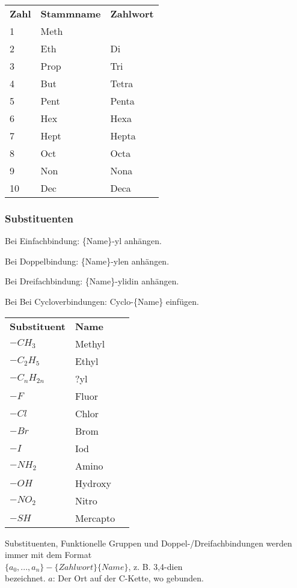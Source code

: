 \begin{center}
	\begin{tabular}{ l  l  l }
		\textbf{Zahl} & \textbf{Stammname} & \textbf{Zahlwort} \\
		1 & Meth & \\
		2 & Eth & Di\\
		3 & Prop & Tri\\
		4 & But & Tetra\\
		5 & Pent & Penta\\
		6 & Hex & Hexa\\
		7 & Hept & Hepta\\
		8 & Oct & Octa\\
		9 & Non &Nona\\
		10 & Dec &Deca\\
	\end{tabular}
\end{center}

\subsubsection{Substituenten}

Bei Einfachbindung: \{Name\}-yl anhängen.

Bei Doppelbindung:  \{Name\}-ylen anhängen.

Bei Dreifachbindung:  \{Name\}-ylidin anhängen.

Bei Bei Cycloverbindungen:  Cyclo-\{Name\} einfügen.

\begin{center}
	\begin{tabular}{ l  l  l }
		\textbf{Substituent} & \textbf{Name} \\
		$-CH_3$ & Methyl \\
		$-C_2H_5$ & Ethyl \\
		$-C_nH_{2n}$ & ?yl \\
		$-F$ & Fluor \\
		$-Cl$ & Chlor \\
		$-Br$ & Brom \\
		$-I$ & Iod \\
		$-NH_2$ & Amino \\
		$-OH$ & Hydroxy \\
		$-NO_2$ & Nitro \\
		$-SH$ & Mercapto \\
	\end{tabular}
\end{center}

\begin{note}
	Substituenten, Funktionelle Gruppen und Doppel-/Dreifachbindungen werden immer mit dem Format \\
	
	$\{a_0,...,a_n\}-\{Zahlwort\}\{Name\}$, z. B. 3,4-dien \\
	
	bezeichnet. 
	$a$: Der Ort auf der C-Kette, wo gebunden.
\end{note}

